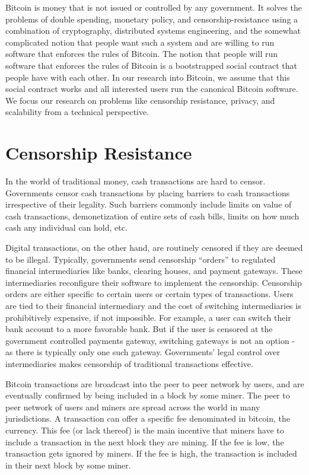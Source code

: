 Bitcoin is money that is not issued or controlled by any government. It solves the problems of double spending, monetary policy, and censorship-resistance using a combination of cryptography, distributed systems engineering, and the somewhat complicated notion that people want such a system and are willing to run software that enforces the rules of Bitcoin. The notion that people will run software that enforces the rules of Bitcoin is a bootstrapped social contract that people have with each other. In our research into Bitcoin, we assume that this social contract works and all interested users run the canonical Bitcoin software. We focus our research on problems like censorship resistance, privacy, and scalability from a technical perspective.

\section{Censorship Resistance}
In the world of traditional money, cash transactions are hard to censor. Governments censor cash transactions by placing barriers to cash transactions irrespective of their legality. Such barriers commonly include limits on value of cash transactions, demonetization of entire sets of cash bills, limits on how much cash any individual can hold, etc. 

Digital transactions, on the other hand, are routinely censored if they are deemed to be illegal. Typically, governments send censorship ``orders'' to regulated financial intermediaries like banks, clearing houses, and payment gateways. These intermediaries reconfigure their software to implement the censorship. Censorship orders are either specific to certain users or certain types of transactions. Users are tied to their financial intermediary and the cost of switching intermediaries is prohibitively expensive, if not impossible. For example, a user can switch their bank account to a more favorable bank. But if the user is censored at the government controlled payments gateway, switching gateways is not an option - as there is typically only one such gateway. Governments' legal control over intermediaries makes censorship of traditional transactions effective.

Bitcoin transactions are broadcast into the peer to peer network by users, and are eventually confirmed by being included in a block by some miner. The peer to peer network of users and miners are spread across the world in many jurisdictions. A transaction can offer a specific fee denominated in bitcoin, the currency. This fee (or lack thereof) is the main incentive that miners have to include a transaction in the next block they are mining. If the fee is low, the transaction gets ignored by miners. If the fee is high, the transaction is included in their next block by some miner.

